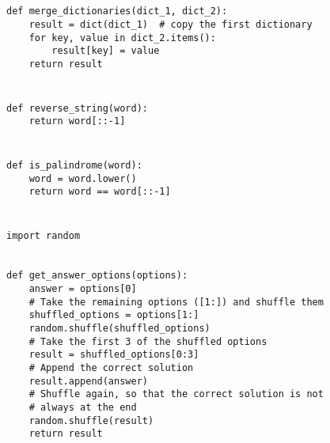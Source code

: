 \documentclass[a4paper]{article}
\begin{document}




\section{}
\begin{verbatim}
def merge_dictionaries(dict_1, dict_2):
    result = dict(dict_1)  # copy the first dictionary
    for key, value in dict_2.items():
        result[key] = value
    return result
\end{verbatim}

\section{}
\begin{verbatim}
def reverse_string(word):
    return word[::-1]
\end{verbatim}

\section{} 
\begin{verbatim}
def is_palindrome(word):
    word = word.lower()
    return word == word[::-1]
\end{verbatim}

\section{}
\begin{verbatim}
import random


def get_answer_options(options):
    answer = options[0]
    # Take the remaining options ([1:]) and shuffle them
    shuffled_options = options[1:]
    random.shuffle(shuffled_options)
    # Take the first 3 of the shuffled options
    result = shuffled_options[0:3]
    # Append the correct solution
    result.append(answer)
    # Shuffle again, so that the correct solution is not
    # always at the end
    random.shuffle(result)
    return result
\end{verbatim}
\end{document}
